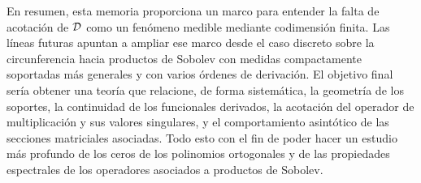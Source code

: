 En resumen, esta memoria proporciona un marco para entender la falta de acotación
de \(\mathcal{D}\) como un fenómeno medible mediante codimensión finita. Las líneas futuras
apuntan a ampliar ese marco desde el caso discreto sobre la circunferencia hacia
productos de Sobolev con medidas compactamente soportadas más generales y con
varios órdenes de derivación. El objetivo final sería obtener una teoría que
relacione, de forma sistemática, la geometría de los soportes, la continuidad de
los funcionales derivados, la acotación del operador de multiplicación y sus
valores singulares, y el comportamiento asintótico de las secciones matriciales asociadas. Todo esto con el fin de poder hacer un estudio más profundo de los ceros de los polinomios ortogonales y de las propiedades espectrales de los operadores asociados a productos de Sobolev.
